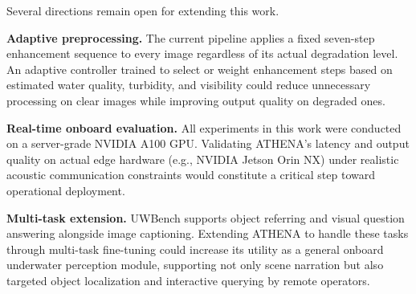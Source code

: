 Several directions remain open for extending this work.

\textbf{Adaptive preprocessing.} The current pipeline applies a fixed seven-step enhancement sequence to every image regardless of its actual degradation level. An adaptive controller trained to select or weight enhancement steps based on estimated water quality, turbidity, and visibility could reduce unnecessary processing on clear images while improving output quality on degraded ones.

\textbf{Real-time onboard evaluation.} All experiments in this work were conducted on a server-grade NVIDIA A100 GPU. Validating ATHENA's latency and output quality on actual edge hardware (e.g., NVIDIA Jetson Orin NX) under realistic acoustic communication constraints would constitute a critical step toward operational deployment.

\textbf{Multi-task extension.} UWBench supports object referring and visual question answering alongside image captioning. Extending ATHENA to handle these tasks through multi-task fine-tuning could increase its utility as a general onboard underwater perception module, supporting not only scene narration but also targeted object localization and interactive querying by remote operators.
